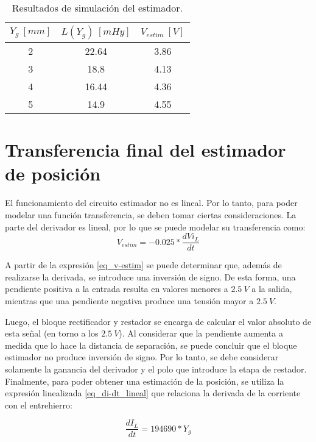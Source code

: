 \begin{table}[H]
	\begin{center}
		\begin{tabular}{| c | c | c |}
			\hline
			$Y_g\:[mm]$ & $L(Y_g)\:[mHy]$ & $V_{estim}\:[V]$ \\ \hline 
			2 & 22.64 & 3.86 \\ \hline 
			3 & 18.8 & 4.13 \\ \hline 
			4 & 16.44 & 4.36 \\ \hline 
			5 & 14.9 & 4.55 \\ \hline 
		\end{tabular}
		\caption{Resultados de simulación del estimador.}
		\label{tab_Resultados_de_simulación_del_estimador}
	\end{center}
\end{table}

\section{Transferencia final del estimador de posición}

El funcionamiento del circuito estimador no es lineal.  Por lo tanto, para poder modelar una función transferencia, se deben tomar ciertas consideraciones. La parte del derivador es lineal, por lo que se puede modelar su transferencia como:
\begin{equation}\label{eq_v-estim}
	V_{estim}=-0.025*\frac{dVi_L}{dt} 
\end{equation}

A partir de la expresión \ref{eq_v-estim} se puede determinar que, además de realizarse la derivada, se introduce una inversión de signo. De esta forma, una pendiente positiva a la entrada resulta en valores menores a $2.5\:V$ a la salida, mientras que una pendiente negativa produce una tensión mayor a $2.5\:V$.

Luego, el bloque rectificador y restador se encarga de calcular el valor absoluto de esta señal (en torno a los $2.5\:V$). Al considerar que la pendiente aumenta a medida que lo hace la distancia de separación, se puede concluir que el bloque estimador no produce inversión de signo. Por lo tanto, se debe considerar solamente la ganancia del derivador y el polo que introduce la etapa de restador. Finalmente, para poder obtener una estimación de la posición, se utiliza la expresión linealizada \ref{eq_di-dt_lineal} que relaciona la derivada de la corriente con el entrehierro:

\begin{equation} \label{eq_dil_yg}
	\frac{dI_{L}}{dt} = 194690 * Y_{g}
\end{equation}


